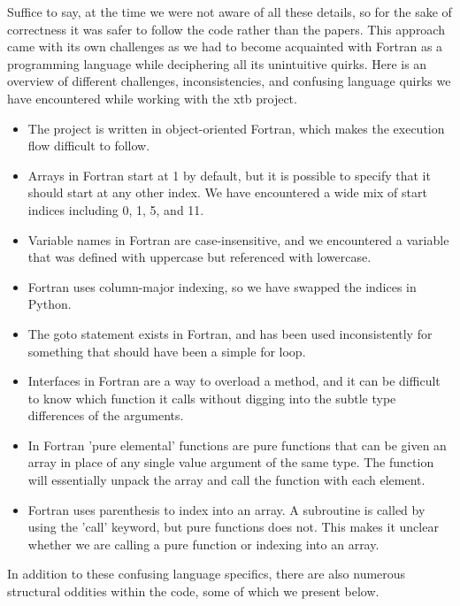 Suffice to say, at the time we were not aware of all these details, so for the sake of correctness it was safer to follow the code rather than the papers. This approach came with its own challenges as we had to become acquainted with Fortran as a programming language while deciphering all its unintuitive quirks.
Here is an overview of different challenges, inconsistencies, and confusing language quirks we have encountered while working with the xtb project.

\begin{itemize}
        \item The project is written in object-oriented Fortran, which makes the execution flow difficult to follow.
        \item Arrays in Fortran start at 1 by default, but it is possible to specify that it should start at any other index. We have encountered a wide mix of start indices including 0, 1, 5, and 11.
        \item Variable names in Fortran are case-insensitive, and we encountered a variable that was defined with uppercase but referenced with lowercase.
        \item Fortran uses column-major indexing, so we have swapped the indices in Python.
        \item The goto statement exists in Fortran, and has been used inconsistently for something that should have been a simple for loop.
        \item Interfaces in Fortran are a way to overload a method, and it can be difficult to know which function it calls without digging into the subtle type differences of the arguments.
        \item In Fortran 'pure elemental' functions are pure functions that can be given an array in place of any single value argument of the same type. The function will essentially unpack the array and call the function with each element.
        \item Fortran uses parenthesis to index into an array. A subroutine is called by using the 'call' keyword, but pure functions does not. This makes it unclear whether we are calling a pure function or indexing into an array.
\end{itemize}

In addition to these confusing language specifics, there are also numerous structural oddities within the code, some of which we present below.

